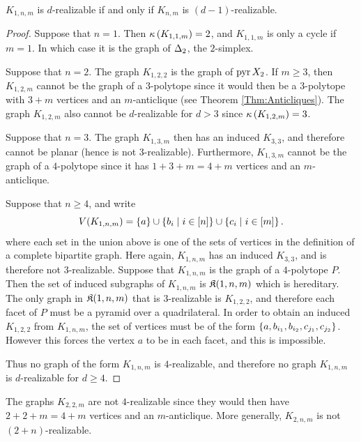     \begin{Theorem}\label{Thm:KOneNM}
        \(K_{1,n,m}\) is \(d\)-realizable if and only if \(K_{n,m}\) is \((d-1)\)-realizable.
    \end{Theorem}
    \begin{proof}
        Suppose that \(n=1\).  Then \(\kappa\left(K_{1,1,m}\right)=2\), and \(K_{1,1,m}\) is only a cycle if \(m=1\).  In which case it is the graph of \(\Delta_{2}\), the \(2\)-simplex.

        Suppose that \(n=2\).  The graph \(K_{1,2,2}\) is the graph of \(\operatorname{pyr}{X_{2}}\).  If \(m\ge 3\), then \(K_{1,2,m}\) cannot be the graph of a \(3\)-polytope since it would then be a \(3\)-polytope with \(3+m\) vertices and an \(m\)-anticlique (see Theorem \ref{Thm:Anticliques}).  The graph \(K_{1,2,m}\) also cannot be \(d\)-realizable for \(d>3\) since \(\kappa\left(K_{1,2,m}\right)=3\).

        Suppose that \(n=3\).  The graph \(K_{1,3,m}\) then has an induced \(K_{3,3}\), and therefore cannot be planar (hence is not \(3\)-realizable).  Furthermore, \(K_{1,3,m}\) cannot be the graph of a \(4\)-polytope since it has \(1+3+m=4+m\) vertices and an \(m\)-anticlique.

        Suppose that \(n\ge4\), and write
            \[
                V(K_{1,n,m})
                    =
                        \seta{a}                \cup
                        \setb{b_i}{i\in\brac n} \cup
                        \setb{c_i}{i\in\brac m}.
            \]
        where each set in the union above is one of the sets of vertices in the definition of a complete bipartite graph.  Here again, \(K_{1,n,m}\) has an induced \(K_{3,3}\), and is therefore not \(3\)-realizable.  Suppose that \(K_{1,n,m}\) is the graph of a \(4\)-polytope \(P\).  Then the set of induced subgraphs of \(K_{1,n,m}\) is \(\mathfrak{K}(1,n,m)\) which is hereditary.  The only graph in \(\mathfrak{K}(1,n,m)\) that is \(3\)-realizable is \(K_{1,2,2}\), and therefore each facet of \(P\) must be a pyramid over a quadrilateral.  In order to obtain an induced \(K_{1,2,2}\) from \(K_{1,n,m}\), the set of vertices must be of the form \(\left\{a,b_{i_1},b_{i_2},c_{j_1},c_{j_2}\right\}\).  However this forces the vertex \(a\) to be in each facet, and this is impossible.

        Thus no graph of the form \(K_{1,n,m}\) is \(4\)-realizable, and therefore no graph \(K_{1,n,m}\) is \(d\)-realizable for \(d\ge 4\).
    \end{proof}

    The graphs \(K_{2,2,m}\) are not \(4\)-realizable since they would then have \(2+2+m=4+m\) vertices and an \(m\)-anticlique.  More generally, \(K_{2,n,m}\) is not \((2+n)\)-realizable.

